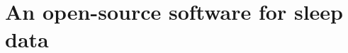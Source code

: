 \cleardoublepage

\chapter{An open-source software for sleep data}
\label{res:software}

\cleardoublepage



